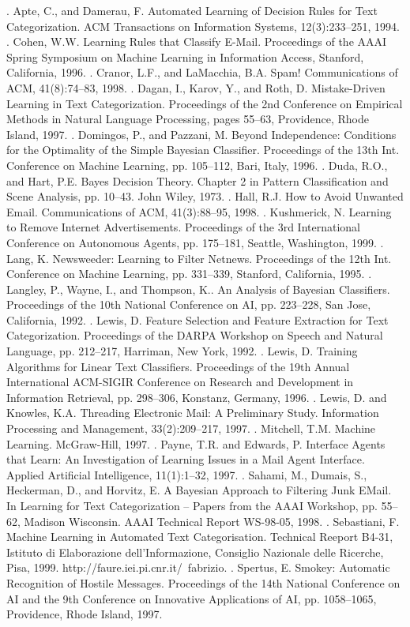 \documentclass[UTF8]{ctexart}
\begin{document}
\begin{thebibliography}{99}
. Apte, C., and Damerau, F. Automated Learning of Decision Rules for Text Categorization. ACM Transactions on Information Systems, 12(3):233–251, 1994.
. Cohen, W.W. Learning Rules that Classify E-Mail. Proceedings of the AAAI Spring Symposium on Machine Learning in Information Access, Stanford, California, 1996.
. Cranor, L.F., and LaMacchia, B.A. Spam! Communications of ACM, 41(8):74–83, 1998.
. Dagan, I., Karov, Y., and Roth, D. Mistake-Driven Learning in Text Categorization. Proceedings of the 2nd Conference on Empirical Methods in Natural Language Processing, pages 55–63, Providence, Rhode Island, 1997.
. Domingos, P., and Pazzani, M. Beyond Independence: Conditions for the Optimality of the Simple Bayesian Classifier. Proceedings of the 13th Int. Conference on Machine Learning, pp. 105–112, Bari, Italy, 1996.
. Duda, R.O., and Hart, P.E. Bayes Decision Theory. Chapter 2 in Pattern Classification and Scene Analysis, pp. 10–43. John Wiley, 1973.
. Hall, R.J. How to Avoid Unwanted Email. Communications of ACM, 41(3):88–95, 1998.
. Kushmerick, N. Learning to Remove Internet Advertisements. Proceedings of the 3rd International Conference on Autonomous Agents, pp. 175–181, Seattle, Washington, 1999.
. Lang, K. Newsweeder: Learning to Filter Netnews. Proceedings of the 12th Int. Conference on Machine Learning, pp. 331–339, Stanford, California, 1995.
. Langley, P., Wayne, I., and Thompson, K.. An Analysis of Bayesian Classifiers. Proceedings of the 10th National Conference on AI, pp. 223–228, San Jose, California, 1992.
. Lewis, D. Feature Selection and Feature Extraction for Text Categorization. Proceedings of the DARPA Workshop on Speech and Natural Language, pp. 212–217, Harriman, New York, 1992.
. Lewis, D. Training Algorithms for Linear Text Classifiers. Proceedings of the 19th Annual International ACM-SIGIR Conference on Research and Development in Information Retrieval, pp. 298–306, Konstanz, Germany, 1996.
. Lewis, D. and Knowles, K.A. Threading Electronic Mail: A Preliminary Study. Information Processing and Management, 33(2):209–217, 1997.
. Mitchell, T.M. Machine Learning. McGraw-Hill, 1997.
. Payne, T.R. and Edwards, P. Interface Agents that Learn: An Investigation of Learning Issues in a Mail Agent Interface. Applied Artificial Intelligence, 11(1):1–32, 1997.
. Sahami, M., Dumais, S., Heckerman, D., and Horvitz, E. A Bayesian Approach to Filtering Junk EMail. In Learning for Text Categorization – Papers from the AAAI Workshop, pp. 55–62, Madison Wisconsin. AAAI Technical Report WS-98-05, 1998.
. Sebastiani, F. Machine Learning in Automated Text Categorisation. Technical Reeport B4-31, Istituto di Elaborazione dell'Informazione, Consiglio Nazionale delle Ricerche, Pisa, 1999. http://faure.iei.pi.cnr.it/~fabrizio.
. Spertus, E. Smokey: Automatic Recognition of Hostile Messages. Proceedings of the 14th National Conference on AI and the 9th Conference on Innovative Applications of AI, pp. 1058–1065, Providence, Rhode Island, 1997.
\end{thebibliography}
\end{document}

